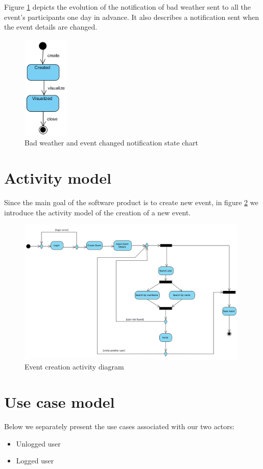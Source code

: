 \documentclass[10pt,a4paper,titlepage]{article}
\begin{document}
Figure \ref{fig:badWeatherStateChart} depicts the evolution of the notification of bad weather sent to all the event's participants one day in advance. It also describes a notification sent when the event details are changed.
\begin{figure}[h!]
\centering
\includegraphics[height=5cm]{./Uml/StateDiagram_badWeather_eventChanged.png}
\caption[BadWeatherStateChart]{Bad weather and event changed notification state chart}
\label{fig:badWeatherStateChart}
\end{figure}

\section{Activity model}
Since the main goal of the software product is to create new event, in figure \ref{fig:ActivityDiag} we introduce the activity model of the creation of a new event.
\begin{figure}[h!]
\centering
\includegraphics[height=7cm]{./Uml/ActivityDiagram.png}
\caption[ActivityDiag]{Event creation activity diagram}
\label{fig:ActivityDiag}
\end{figure}

\section{Use case model}
Below we separately present the use cases associated with our two actors:
\begin{itemize}
\item Unlogged user
\item Logged user
\end{itemize}
\end{document}
